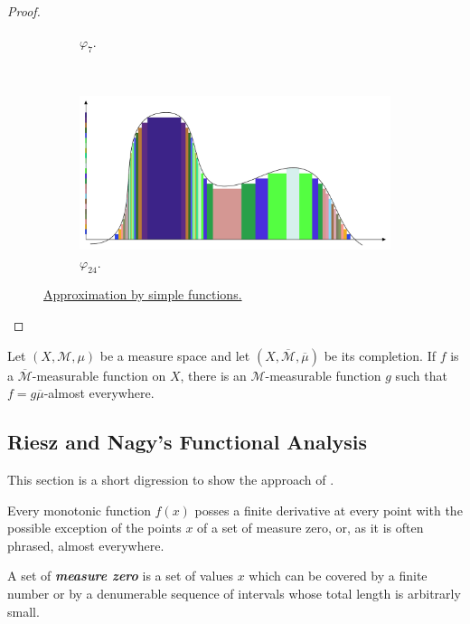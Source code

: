 \documentclass{article}
\theoremstyle{definition}
\numberwithin{equation}{section}
\begin{document}
\begin{itemize}
\begin{proof}
\begin{figure}[H]
\begin{center}
\begin{subfigure}{\linewidth}
						\caption{$\varphi_7$.}
						\label{fig:simple-functions1}
					\end{subfigure}
					\\
					\begin{subfigure}{\linewidth}
						\centering
						\includegraphics[width=1\linewidth]{fig2}
						\caption{$\varphi_{24}$.}
						\label{fig:simple-functions2}
					\end{subfigure}
				\end{center}
				\caption{\href{https://tex.stackexchange.com/questions/667646/lebesgue-integral-on-tikz}{Approximation by simple functions.}}
			\end{figure}
		\end{proof}
		\begin{prop}
			Let $(X,\mathcal{M},\mu)$ be a measure space and let $(X,\overline{\mathcal{M}},\overline{\mu})$ be its completion. If $f$ is a $\overline{\mathcal{M}}$-measurable function on $X$, there is an $\mathcal{M}$-measurable function $g$ such that $f=g\overline{\mu}$-almost everywhere.
		\end{prop}
	\end{itemize}
	\subsection{Riesz and Nagy's Functional Analysis}
	This section is a short digression to show the approach of \cite{riesz}.
	\begin{thm}[Lebesgue]
		Every monotonic function $f(x)$ posses a finite derivative at every point with the possible exception of the points $x$ of a set of measure zero, or, as it is often phrased, almost everywhere.
	\end{thm}
	A set of \textbf{\textit{measure zero}} is a set of values $x$ which can be covered by a finite number or by a denumerable sequence of intervals whose total length is arbitrarly small.
	
\end{document}
